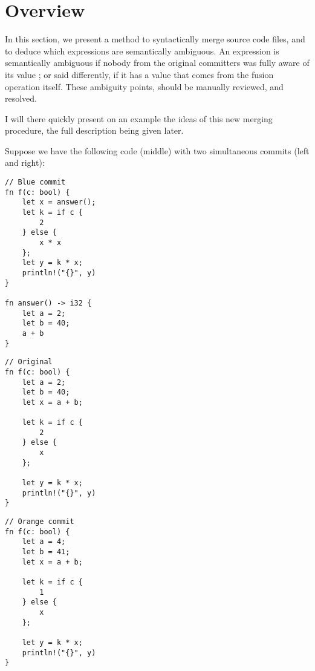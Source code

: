\documentclass[a4paper,11pt]{article}
\newcommand\yrg[1]{{\color{red}{(YRG: #1)}}}
\begin{document}
\section{Overview}
\label{sec:overview}

In this section, we present a method to syntactically merge source
code files, and to deduce which expressions are semantically
ambiguous. An expression is semantically ambiguous if nobody from the
original committers was fully aware of its value ; or said
differently, if it has a value that comes from the fusion operation
itself. These ambiguity points, should be manually reviewed, and
resolved.

\yrg{Commencer par un exemple qui montre que la fusion textuelle
ne fonctionne pas et illustrer la notion d'expression ambigue
sur cet exemple.}

I will there quickly present on an example the ideas of this new
merging procedure, the full description being given later.

Suppose we have the following code (middle) with two simultaneous
commits (left and right):

\noindent
\begin{minipage}{.32\textwidth}
\begin{lstlisting}[rulecolor=\color{blue!20}]
// Blue commit
fn f(c: bool) {
    let x = answer();
    let k = if c {
        2
    } else {
        x * x
    };
    let y = k * x;
    println!("{}", y)
}

fn answer() -> i32 {
    let a = 2;
    let b = 40;
    a + b
}
\end{lstlisting}
\end{minipage}\hfill
\begin{minipage}{.32\textwidth}
\begin{lstlisting}
// Original
fn f(c: bool) {
    let a = 2;
    let b = 40;
    let x = a + b;

    let k = if c {
        2
    } else {
        x
    };

    let y = k * x;
    println!("{}", y)
}
\end{lstlisting}
\end{minipage}\hfill
\begin{minipage}{.32\textwidth}
\begin{lstlisting}[rulecolor=\color{orange!30}]
// Orange commit
fn f(c: bool) {
    let a = 4;
    let b = 41;
    let x = a + b;

    let k = if c {
        1
    } else {
        x
    };

    let y = k * x;
    println!("{}", y)
}
\end{lstlisting}
\end{minipage}
\vspace{-.4cm}
\begin{lstlisting}[label=lst:overview_commits, caption={A source code and two concurrent commits on it}]
\end{lstlisting}
\end{document}
